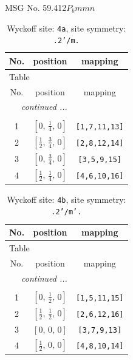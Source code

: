 \documentclass[fleqn,8pt]{jsarticle}
\begin{document}
\setcounter{MaxMatrixCols}{32}

\renewcommand{\tablename}{Table~}
\renewcommand{\figurename}{Figure~}
\begin{center}
\LARGE
MSG No. 59.412\quad$P_{b}mmn$
\end{center}
\renewcommand{\arraystretch}{1.2}
\begin{longtable}{ccc}
\caption{Wyckoff site: {\tt 4a}, site symmetry: {\tt .2'/m.}}
 \\
 \hline \hline
No. & position & mapping \\ \hline \endfirsthead

\multicolumn{2}{l}{\tablename\ \thetable{}} \\
 \hline \hline
No. & position & mapping \\ \hline \endhead

 \hline \hline
\multicolumn{2}{r}{\footnotesize\it continued ...} \\ \endfoot

 \hline \hline
\multicolumn{2}{r}{} \\ \endlastfoot

1 & $\left[ 0,\, \frac{1}{4},\, 0 \right]$ & {\tt [1,7,11,13]} \\ \hline
2 & $\left[ \frac{1}{2},\, \frac{3}{4},\, 0 \right]$ & {\tt [2,8,12,14]} \\ \hline
3 & $\left[ 0,\, \frac{3}{4},\, 0 \right]$ & {\tt [3,5,9,15]} \\ \hline
4 & $\left[ \frac{1}{2},\, \frac{1}{4},\, 0 \right]$ & {\tt [4,6,10,16]} \\
\end{longtable}
\renewcommand{\arraystretch}{1.2}
\begin{longtable}{ccc}
\caption{Wyckoff site: {\tt 4b}, site symmetry: {\tt .2'/m'.}}
 \\
 \hline \hline
No. & position & mapping \\ \hline \endfirsthead

\multicolumn{2}{l}{\tablename\ \thetable{}} \\
 \hline \hline
No. & position & mapping \\ \hline \endhead

 \hline \hline
\multicolumn{2}{r}{\footnotesize\it continued ...} \\ \endfoot

 \hline \hline
\multicolumn{2}{r}{} \\ \endlastfoot

1 & $\left[ 0,\, \frac{1}{2},\, 0 \right]$ & {\tt [1,5,11,15]} \\ \hline
2 & $\left[ \frac{1}{2},\, \frac{1}{2},\, 0 \right]$ & {\tt [2,6,12,16]} \\ \hline
3 & $\left[ 0,\, 0,\, 0 \right]$ & {\tt [3,7,9,13]} \\ \hline
4 & $\left[ \frac{1}{2},\, 0,\, 0 \right]$ & {\tt [4,8,10,14]} \\
\end{longtable}
\end{document}
